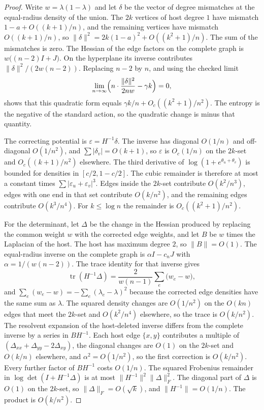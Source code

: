 \documentclass[11pt]{article}
\begin{document}
\begin{proof}
Write \(w=\lambda(1-\lambda)\) and let \(\delta\) be the vector of degree
mismatches at the equal-radius density of the union. The \(2k\) vertices of
host degree \(1\) have mismatch \(1-a+O((k+1)/n)\), and the remaining vertices
have mismatch \(O((k+1)/n)\), so
\(\|\delta\|^2=2k(1-a)^2+O((k^2+1)/n)\). The sum of the mismatches is zero.
The Hessian of the edge factors on the complete graph is
\(w\bigl((n-2)I+J\bigr)\). On the hyperplane its inverse contributes
\(\|\delta\|^2/(2w(n-2))\). Replacing \(n-2\) by \(n\), and using the checked
limit
\[
\lim_{n\to\infty}
\Bigl(
n\cdot\frac{\|\delta\|^2}{2nw}-\gamma k
\Bigr)
=0,
\]
shows that this quadratic form equals \(\gamma k/n+O_c((k^2+1)/n^2)\).
The entropy is the negative of the standard action, so the quadratic change
is minus that quantity.

The correcting potential is \(\varepsilon=H^{-1}\delta\). The inverse has
diagonal \(O(1/n)\) and off-diagonal \(O(1/n^2)\), and \(\sum|\delta_v|=O(k+1)\),
so \(\varepsilon\) is \(O_c(1/n)\) on the \(2k\)-set and \(O_c((k+1)/n^2)\)
elsewhere. The third derivative of \(\log(1+e^{\theta_u+\theta_v})\) is bounded
for densities in \([c/2,1-c/2]\). The cubic remainder is therefore at most a
constant times \(\sum|\varepsilon_u+\varepsilon_v|^3\). Edges inside the
\(2k\)-set contribute \(O(k^2/n^3)\), edges with one end in that set contribute
\(O(k/n^2)\), and the remaining edges contribute \(O(k^3/n^4)\). For
\(k\le\log n\) the remainder is \(O_c((k^2+1)/n^2)\).

For the determinant, let \(\Delta\) be the change in the Hessian produced by
replacing the common weight \(w\) with the corrected edge weights, and let
\(B\) be \(w\) times the Laplacian of the host. The host has maximum degree
\(2\), so \(\|B\|=O(1)\). The equal-radius inverse on the complete graph is
\(\alpha I-c_n J\) with \(\alpha=1/(w(n-2))\). The trace identity for that
inverse gives
\[
\operatorname{tr}(H^{-1}\Delta)
=
\frac{2}{w(n-1)}\sum_e\bigl(w_e-w\bigr),
\]
and \(\sum_e(w_e-w)=-\sum_e(\lambda_e-\lambda)^2\) because the corrected edge
densities have the same sum as \(\lambda\). The squared density changes are
\(O(1/n^2)\) on the \(O(kn)\) edges that meet the \(2k\)-set and
\(O(k^2/n^4)\) elsewhere, so the trace is \(O(k/n^2)\).
The resolvent expansion of the host-deleted inverse differs from the complete
inverse by a series in \(BH^{-1}\). Each host edge \(\{x,y\}\) contributes a
multiple of \((\Delta_{xx}+\Delta_{yy}-2\Delta_{xy})\), the diagonal changes
are \(O(1)\) on the \(2k\)-set and \(O(k/n)\) elsewhere, and
\(\alpha^2=O(1/n^2)\), so the first correction is \(O(k/n^2)\). Every further
factor of \(BH^{-1}\) costs \(O(1/n)\). The squared Frobenius remainder in \(\log\det(I+H^{-1}\Delta)\) is at most
\(\|H^{-1}\|^2\|\Delta\|_F^2\). The diagonal part of \(\Delta\) is \(O(1)\) on
the \(2k\)-set, so \(\|\Delta\|_F=O(\sqrt{k})\), and
\(\|H^{-1}\|=O(1/n)\). The product is \(O(k/n^2)\).
\end{proof}
\end{document}
